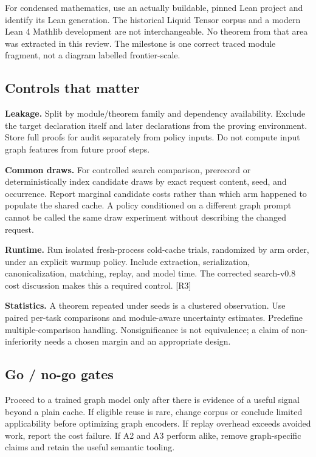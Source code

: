 \documentclass[
  10pt,
]{article}
\begin{document}
For condensed mathematics, use an actually buildable, pinned Lean
project and identify its Lean generation. The historical Liquid Tensor
corpus and a modern Lean 4 Mathlib development are not interchangeable.
No theorem from that area was extracted in this review. The milestone is
one correct traced module fragment, not a diagram labelled
frontier-scale.

\subsection{Controls that matter}\label{controls-that-matter}

\textbf{Leakage.} Split by module/theorem family and dependency
availability. Exclude the target declaration itself and later
declarations from the proving environment. Store full proofs for audit
separately from policy inputs. Do not compute input graph features from
future proof steps.

\textbf{Common draws.} For controlled search comparison, prerecord or
deterministically index candidate draws by exact request content, seed,
and occurrence. Report marginal candidate costs rather than which arm
happened to populate the shared cache. A policy conditioned on a
different graph prompt cannot be called the same draw experiment without
describing the changed request.

\textbf{Runtime.} Run isolated fresh-process cold-cache trials,
randomized by arm order, under an explicit warmup policy. Include
extraction, serialization, canonicalization, matching, replay, and model
time. The corrected search-v0.8 cost discussion makes this a required
control. {[}R3{]}

\textbf{Statistics.} A theorem repeated under seeds is a clustered
observation. Use paired per-task comparisons and module-aware
uncertainty estimates. Predefine multiple-comparison handling.
Nonsignificance is not equivalence; a claim of non-inferiority needs a
chosen margin and an appropriate design.

\subsection{Go / no-go gates}\label{go-no-go-gates}

Proceed to a trained graph model only after there is evidence of a
useful signal beyond a plain cache. If eligible reuse is rare, change
corpus or conclude limited applicability before optimizing graph
encoders. If replay overhead exceeds avoided work, report the cost
failure. If A2 and A3 perform alike, remove graph-specific claims and
retain the useful semantic tooling.
\end{document}
